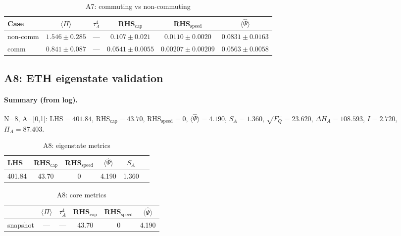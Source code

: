 \documentclass[10pt]{article}
\begin{document}
\begin{table}[!ht]
\centering
\caption{A7: commuting vs non-commuting}
\label{tab:a7-compare}
\begin{tabular}{@{}lccccc@{}}
\toprule
Case & $\langle\Pi\rangle$ & $\tau_A^4$ & RHS$_{\mathrm{cap}}$ & RHS$_{\mathrm{speed}}$ & $\langle\widehat{\Psi}\rangle$ \\
\midrule
non-comm & $1.546\pm0.285$ & — & $0.107\pm0.021$ & $0.0110\pm0.0020$ & $0.0831\pm0.0163$ \\
comm     & $0.841\pm0.087$ & — & $0.0541\pm0.0055$ & $0.00207\pm0.00209$ & $0.0563\pm0.0058$ \\
\bottomrule
\end{tabular}
\end{table}

\subsection{A8: ETH eigenstate validation}\label{app:a8}


\paragraph{Summary (from log).}
N=8, A=[0,1]: LHS$=401.84$, RHS$_{\mathrm{cap}}=43.70$, RHS$_{\mathrm{speed}}=0$, $\langle\widehat{\Psi}\rangle=4.190$, $S_A=1.360$, $\sqrt{F_Q}=23.620$, $\Delta H_A=108.593$, $I=2.720$, $\Pi_A=87.403$.

\begin{table}[!ht]
\centering
\caption{A8: eigenstate metrics}
\label{tab:a8-eigen}
\begin{tabular}{@{}lccccc@{}}
\toprule
LHS & RHS$_{\mathrm{cap}}$ & RHS$_{\mathrm{speed}}$ & $\langle\widehat{\Psi}\rangle$ & $S_A$ \\
\midrule
401.84 & 43.70 & 0 & 4.190 & 1.360 \\
\bottomrule
\end{tabular}
\end{table}

\begin{table}[!ht]
\centering
\caption{A8: core metrics}
\label{tab:a8-core}
\begin{tabular}{@{}lccccc@{}}
\toprule
 & $\langle\Pi\rangle$ & $\tau_A^4$ & RHS$_{\mathrm{cap}}$ & RHS$_{\mathrm{speed}}$ & $\langle\widehat{\Psi}\rangle$ \\
\midrule
snapshot & — & — & 43.70 & 0 & 4.190 \\
\bottomrule
\end{tabular}
\end{table}
\end{document}
